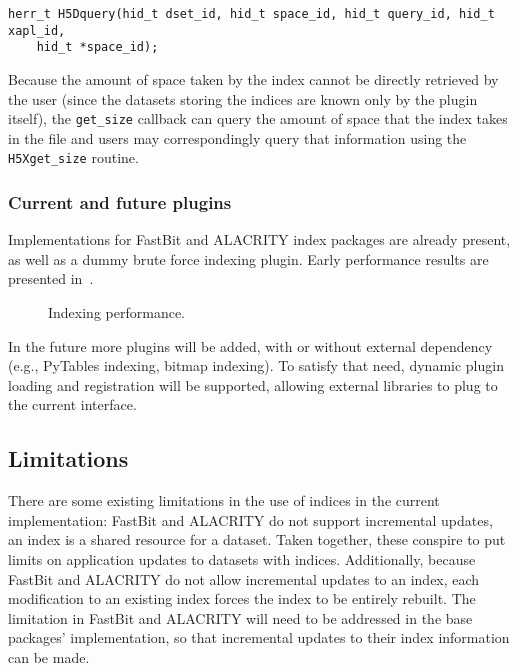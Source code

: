{
\begin{lstlisting}
herr_t H5Dquery(hid_t dset_id, hid_t space_id, hid_t query_id, hid_t xapl_id,
    hid_t *space_id);
\end{lstlisting}
}

Because the amount of space taken by the index cannot be directly retrieved by
the user (since the datasets storing the indices are known only by the plugin
itself), the \texttt{get\_size} callback can query the amount of space that
the index takes in the file and users may correspondingly query that information using the
\texttt{H5Xget\_size} routine.

\subsubsection{Current and future plugins}

Implementations for FastBit and ALACRITY index packages are already
present, as well as a dummy brute force indexing plugin. Early performance results
are presented in~.

\begin{figure}

\caption{Indexing performance.}
\label{fig:indexing_perf}
\vspace{-20pt}
\end{figure}

In the future more plugins will be added, with or without external dependency
(e.g., PyTables indexing, bitmap indexing).
To satisfy that need, dynamic plugin loading and registration will be supported,
allowing external libraries to plug to the current interface.

\subsection{Limitations}

There are some existing limitations in the use of indices in the current
implementation: FastBit and ALACRITY do not support incremental updates,
an index is a shared resource for a dataset. Taken together, these conspire to
put limits on application updates to datasets with indices.
Additionally, because FastBit and ALACRITY do not allow incremental updates to
an index, each modification to an existing index forces the index to be entirely
rebuilt. The limitation in FastBit and ALACRITY will need to be addressed in
the base packages' implementation, so that incremental updates
to their index information can be made.

